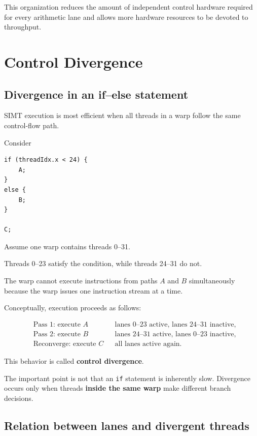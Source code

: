 \documentclass[11pt,a4paper]{article}
\begin{document}
This organization reduces the amount of independent control hardware required for every arithmetic lane and allows more hardware resources to be devoted to throughput.

\section{Control Divergence}

\subsection{Divergence in an if--else statement}

SIMT execution is most efficient when all threads in a warp follow the same control-flow path.

Consider

\begin{lstlisting}
if (threadIdx.x < 24) {
    A;
}
else {
    B;
}

C;
\end{lstlisting}

Assume one warp contains threads 0--31.

Threads 0--23 satisfy the condition, while threads 24--31 do not.

The warp cannot execute instructions from paths \(A\) and \(B\) simultaneously because the warp issues one instruction stream at a time.

Conceptually, execution proceeds as follows:

\[
\begin{aligned}
&\text{Pass 1: execute }A
&&\text{lanes 0--23 active, lanes 24--31 inactive},\\
&\text{Pass 2: execute }B
&&\text{lanes 24--31 active, lanes 0--23 inactive},\\
&\text{Reconverge: execute }C
&&\text{all lanes active again}.
\end{aligned}
\]

This behavior is called \textbf{control divergence}.

The important point is not that an \texttt{if} statement is inherently slow. Divergence occurs only when threads \textbf{inside the same warp} make different branch decisions.

\subsection{Relation between lanes and divergent threads}
\end{document}
